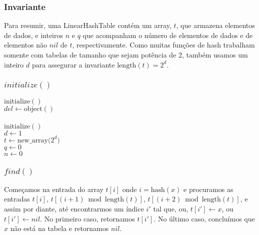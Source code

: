 \documentclass{beamer}
\begin{document}
\begin{frame}
\frametitle{Invariante}
Para resumir, uma LinearHashTable contém um array, $ t$, que armazena elementos de dados, e inteiros $n$ e $ \ensuremath{q}$ que acompanham o número de elementos de dados e de elementos não $ \ensuremath{\ensuremath{\mathit{nil}}}$ de $ t$, respectivamente. Como muitas funções de hash trabalham somente com tabelas de tamanho que sejam potência de  2, também usamos um inteiro $ \ensuremath{d}$ para assegurar a invariante $ \ensuremath{\ensuremath{\mathrm{length}(t)}}=2^\ensuremath{\ensuremath{d}}$. 

\end{frame}

\begin{frame}
\frametitle{$initialize()$}
\begin{oframed}
\begin{flushleft}
\hspace*{1em} \ensuremath{\mathrm{initialize}()}\\
\hspace*{1em} \hspace*{1em} \ensuremath{\mathit{del} \gets  \ensuremath{\mathrm{object}()}}\\
\ \\
\hspace*{1em} \ensuremath{\mathrm{initialize}()}\\
\hspace*{1em} \hspace*{1em} \ensuremath{d \gets  1}\\
\hspace*{1em} \hspace*{1em} \ensuremath{t \gets  \ensuremath{\mathrm{new\_array}(2^{d}})}\\
\hspace*{1em} \hspace*{1em} \ensuremath{q \gets  0}\\
\hspace*{1em} \hspace*{1em} \ensuremath{n \gets  0}\\
\end{flushleft}
\end{oframed}

\end{frame}

\begin{frame}
\frametitle{$find()$}

Começamos na entrada do array \ensuremath{\ensuremath{t[i]}} onde $\ensuremath{\ensuremath{i}}=\ensuremath{\ensuremath{\mathrm{hash}(x)}}$ e procuramos as entradas \ensuremath{\ensuremath{t[i]}},
$t[(\ensuremath{\ensuremath{i}}+1)\bmod \ensuremath{\ensuremath{\mathrm{length}(t)}}]$, $t[(\ensuremath{\ensuremath{i}}+2)\bmod \ensuremath{\ensuremath{\mathrm{length}(t)}}]$, e assim por diante,
até encontrarmos um índice \ensuremath{i'} tal que, ou, \ensuremath{\ensuremath{t[i']\gets x}}, ou \ensuremath{\ensuremath{t[i']\gets \ensuremath{nil}}}.
No primeiro caso, retornamos \ensuremath{\ensuremath{t[i']}}. No último caso, concluímos que \ensuremath{\ensuremath{x}} não está na tabela e retornamos \ensuremath{\ensuremath{\ensuremath{\mathit{nil}}}}.
\end{frame}
\end{document}
